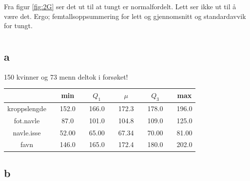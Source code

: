 Fra figur \ref{fig:2G} ser det ut til at tungt er normalfordelt. Lett ser ikke ut til å være det. Ergo; femtallsoppsummering for lett og gjennomsnitt og standardavvik for tungt. 






























\pagebreak
\section{}

\subsection*{a}

150 kvinner og 73 menn deltok i forsøket! 

\begin{center}
\label{tab:summary}
\begin{tabularx}{\textwidth}{c X c X c X c X c X c }
    \hline
    \hline
         && min && $Q_1$ && $\mu$ && $Q_3$ && max \\
    \hline
    kroppslengde   	&& 152.0 && 166.0 && 172.3 && 178.0 && 196.0 \\
    fot.navle    	&&  87.0 && 101.0 && 104.8 && 109.0 && 125.0 \\
    navle.isse	 	&& 52.00 && 65.00 && 67.34 && 70.00 && 81.00 \\
    favn			&& 146.0 && 165.0 && 172.4 && 180.0 && 202.0 \\

    \hline
\end{tabularx}
\end{center}

\subsection*{b}


